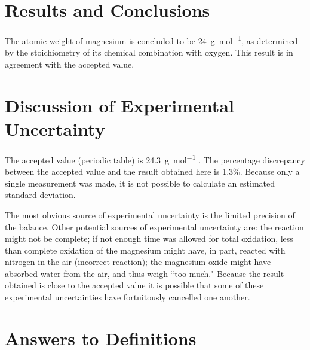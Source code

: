 \documentclass{article}
\begin{document}

\section{Results and Conclusions}

The atomic weight of magnesium is concluded to be \SI{24}{\gram\per\mol}, as determined by the stoichiometry of its chemical combination with oxygen. This result is in agreement with the accepted value.

\begin{figure}[h]
\end{figure}


\section{Discussion of Experimental Uncertainty}

The accepted value (periodic table) is \SI{24.3}{\gram\per\mole} \cite{Smith:2012qr}. The percentage discrepancy between the accepted value and the result obtained here is 1.3\%. Because only a single measurement was made, it is not possible to calculate an estimated standard deviation.

The most obvious source of experimental uncertainty is the limited precision of the balance. Other potential sources of experimental uncertainty are: the reaction might not be complete; if not enough time was allowed for total oxidation, less than complete oxidation of the magnesium might have, in part, reacted with nitrogen in the air (incorrect reaction); the magnesium oxide might have absorbed water from the air, and thus weigh ``too much." Because the result obtained is close to the accepted value it is possible that some of these experimental uncertainties have fortuitously cancelled one another.


\section{Answers to Definitions}
\end{document}
